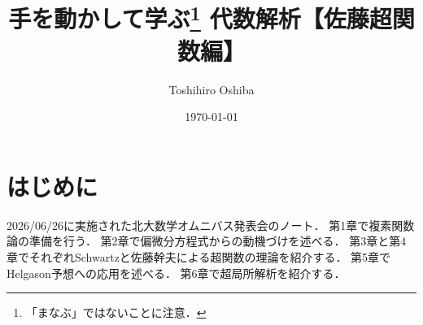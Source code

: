 \newcommand{\mucat}[2][]{\mathsf{D}^{\mathrm{b}}_{#1}(#2)}

\newcommand{\conv}[1][]{\mathbin{\mathop{\circ}\limits_{#1}}}


\newcommand{\lopen}{\mathopen{]}}
\newcommand{\lclosed}{\mathopen{[}}
\newcommand{\ropen}{\mathclose{[}}
\newcommand{\rclosed}{\mathopen{]}}

\DeclarePairedDelimiter{\openintvl}{]}{[}     %
\DeclarePairedDelimiter{\closedintvl}{[}{]}       %
\DeclarePairedDelimiter{\lopenrclosedintvl}{]}{]}    %
\DeclarePairedDelimiter{\lcosedropenintvl}{[}{[}    %


\newcommand{\sm}{\raisebox{2.33pt}{~\rule{6.4pt}{1.3pt}~}}
\newcommand{\smi}{\smallsetminus}

\newcommand{\smid}{\mathrel{;}}

\newcommand{\hfun}[1][]{\mathcal{B}_{#1}}
\newcommand{\mfun}[1][]{\mathcal{C}_{#1}}
\newcommand{\mildhfun}[1][]{\widehat{\mathcal{B}}_{#1}}
\newcommand{\mildmfun}[1][]{\widehat{\mathcal{C}}_{#1}}

\newcommand{\micro}[1]{\mu_{#1}\hspace{0pt}}

\newcommand{\rrp}{\rr^{+}}
\newcommand{\Dbconic}{\mathop{\mathsf{D}^\mathrm{b}_{\rrp}}\nolimits}
\newcommand{\iu}{\sqrt{-1}}

\DeclareMathOperator{\WFa}{\mathrm{WF}_\mathrm{A}} %
\DeclareMathOperator{\WF}{\mathrm{WF}} %
\DeclareMathOperator{\SingSpec}{\mathrm{S}\text{.}\mathrm{S}\text{.}} %
\DeclareMathOperator{\SingSupp}{\mathrm{singsupp}} %
\newcommand{\Char}{\mathop{\mathrm{Char}}\nolimits}


\title{手を動かして学ぶ\footnote{「まなぶ」ではないことに注意．} 代数解析【佐藤超関数編】}
\author{Toshihiro Oshiba}
\date{\today}

\maketitle

\section*{はじめに}
2026/06/26に実施された北大数学オムニバス発表会のノート．
第1章で複素関数論の準備を行う．
第2章で偏微分方程式からの動機づけを述べる．
第3章と第4章でそれぞれSchwartzと佐藤幹夫による超関数の理論を紹介する．
第5章でHelgason予想への応用を述べる．
第6章で超局所解析を紹介する．

